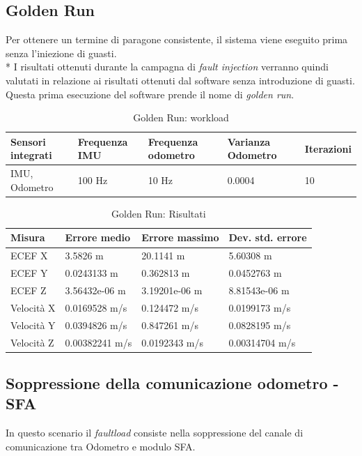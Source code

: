 \subsection{Golden Run}
Per ottenere un termine di paragone consistente, il sistema viene eseguito prima senza l'iniezione di guasti.\\*
I risultati ottenuti durante la campagna di \emph{fault injection} verranno quindi valutati in relazione ai risultati ottenuti dal software senza introduzione di guasti. Questa prima esecuzione del software prende il nome di \emph{golden run}.
\begin{table}[h]
	\centering
	\begin{tabular}{|p{3.25cm}|p{2cm}|p{2cm}|p{2cm}|p{2cm}|}
		\hline 
		\textbf{Sensori integrati} & \textbf{Frequenza IMU}  & \textbf{Frequenza odometro} & \textbf{Varianza Odometro} & \textbf{Iterazioni} \\ 
		\hline 
		IMU, Odometro & 100 Hz & 10 Hz & 0.0004 & 10 \\
		\hline 
	\end{tabular}
	\caption{Golden Run: workload}
	\label{tab:exp12}
\end{table}
\begin{table}[h]
	\centering
	\begin{tabular}{|p{2cm}|p{3cm}|p{3cm}|p{3cm}|}
		\hline 
		\textbf{Misura} & \textbf{Errore medio}  & \textbf{Errore massimo} & \textbf{Dev. std. errore}\\ 
		\hline 
		ECEF X & 3.5826 m & 20.1141 m & 5.60308 m \\ 
		\hline 
		ECEF Y & 0.0243133 m & 0.362813 m & 0.0452763 m \\ 
		\hline 
		ECEF Z & 3.56432e-06 m & 3.19201e-06 m & 8.81543e-06 m \\ 
		\hline 
		Velocit\`a X & 0.0169528 m/s & 0.124472 m/s & 0.0199173 m/s \\ 
		\hline 
		Velocit\`a Y & 0.0394826 m/s & 0.847261 m/s & 0.0828195 m/s \\ 
		\hline 
		Velocit\`a Z & 0.00382241 m/s & 0.0192343 m/s & 0.00314704 m/s \\ 
		\hline 
	\end{tabular}
	\caption{Golden Run: Risultati}
	\label{tab:exp12res}
\end{table}
\FloatBarrier
\subsection{Soppressione della comunicazione odometro - SFA}
In questo scenario il \emph{faultload} consiste nella soppressione del canale di comunicazione tra Odometro e modulo SFA.
